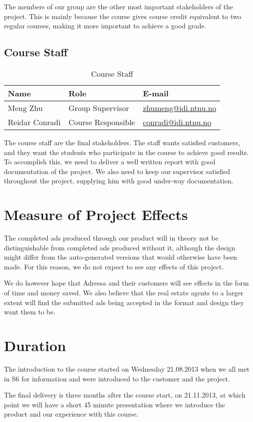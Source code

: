 The members of our group are the other most important stakeholders of the project. This is mainly because the course gives course credit equivalent to two regular courses, making it more important to achieve a good grade.

\subsection{Course Staff}
\begin{table}[H]
\begin{tabular}{|p{4cm}|p{4cm}|p{5cm}|}
\hline
\textbf{Name} & \textbf{Role} & \textbf{E-mail} \\
\hline
Meng Zhu & Group Supervisor & \href{mailto://zhumeng@idi.ntnu.no}{zhumeng@idi.ntnu.no}\\
\hline
Reidar Conradi & Course Responsible & \href{mailto://conradi@idi.ntnu.no}{conradi@idi.ntnu.no}\\
\hline
\end{tabular}
\caption{Course Staff}
\end{table}

The course staff are the final stakeholders. The staff wants satisfied customers, and they want the students who participate in the course to achieve good results. To accomplish this, we need to deliver a well written report with good documentation of the project. We also need to keep our supervisor satisfied throughout the project, supplying him with good under-way documentation.

\section{Measure of Project Effects}
The completed ads produced through our product will in theory not be distinguishable from completed ads produced without it, although the design might differ from the auto-generated versions that would otherwise have been made. For this reason, we do not expect to see any effects of this project.

We do however hope that Adressa and their customers will see effects in the form of time and money saved. We also believe that the real estate agents to a larger extent will find the submitted ads being accepted in the format and design they want them to be.

\section{Duration}
The introduction to the course started on Wednesday 21.08.2013 when we all met in S6 for information and were introduced to the customer and the project.

The final delivery is three months after the course start, on 21.11.2013, at which point we will have a short 45 minute presentation where we introduce the product and our experience with this course.